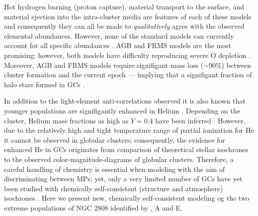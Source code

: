 Hot hydrogen burning (proton capture), material transport to the surface, and
material ejection into the intra-cluster media are features of each of these
models and consequently they can all be made to {\it qualitatively} agree with
the observed elemental abundances. However, none of the standard models can
currently account for all specific abundances \citep{Gratton2012}. AGB and FRMS
models are the most promising; however, both models have difficulty reproducing
severe O depletion \citep{Ventura2009,Decressin2007}. Moreover, AGB and FRMS
models require signifigant mass loss ($\sim 90\%$) between cluster formation
and the current epoch --- implying that a signifigant fraction of halo stars
formed in GCs \citep{Renzini2008,DErcole2008,Bastian2015}.

In addition to the light-element anti-correlations observed it is also known
that younger populations are signifigantly enhanced in Helium
\citep{Piotto2007, Piotto2015, Latour2019}. Depending on the cluster, Helium
mass fractions as high as $Y=0.4$ have been inferred \citep[e.g][]{Milone2015}.
However, due to the relatively high and tight temperature range of partial
ionization for He it cannot be observed in globular clusters; consequently, the
evidence for enhanced He in GCs originates from comparison of theoretical
stellar isochrones to the observed color-magnitude-diagrams of globular
clusters. Therefore, a careful handling of chemistry is essential when modeling
with the aim of discriminating between MPs; yet, only a very limited number of
GCs have yet been studied with chemically self-consistent (structure and
atmosphere) isochrones \citep[e.g.][NGC 6752]{Dotter2015}. Here we present new,
chemically self-consistent modeling og the two extreme populations of NGC 2808
identified by \citet{Milone2015}, A and E.


